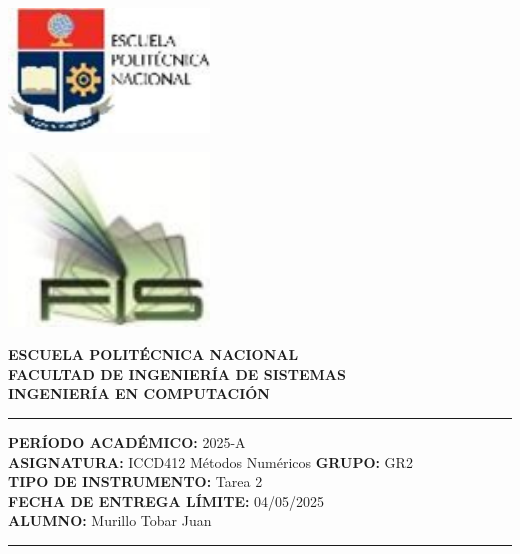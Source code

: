 \documentclass[12pt]{article}
\begin{document}
\begin{minipage}{0.45\textwidth}
    \includegraphics[width=0.4\textwidth]{inFiles/Figures/epnLogo.jpg}
\end{minipage}
\hfill
\begin{minipage}{0.45\textwidth}
    \raggedleft
    \includegraphics[width=0.4\textwidth]{inFiles/Figures/FIS_logo.jpg}
\end{minipage}

\vspace{0.5cm}

\begin{center}
    \textbf{ESCUELA POLITÉCNICA NACIONAL}\\[0.2cm]
    \textbf{FACULTAD DE INGENIERÍA DE SISTEMAS}\\[0.2cm]
    \textbf{INGENIERÍA{\textbf{ EN COMPUTACIÓN}}}
\end{center}

\vspace{0.5cm}
\hrule
\vspace{0.5cm}

\noindent\textbf{PERÍODO ACADÉMICO:} 2025-A\\[0.2cm]
\noindent\textbf{ASIGNATURA:} ICCD412 Métodos Numéricos \hfill \textbf{GRUPO:} GR2\\[0.2cm]
\noindent\textbf{TIPO DE INSTRUMENTO:} Tarea 2\\[0.2cm]
\noindent\textbf{FECHA DE ENTREGA LÍMITE:} 04/05/2025\\[0.2cm]
\noindent\textbf{ALUMNO:} Murillo Tobar Juan 

\vspace{0.5cm}
\hrule
\vspace{1cm}
\end{document}
